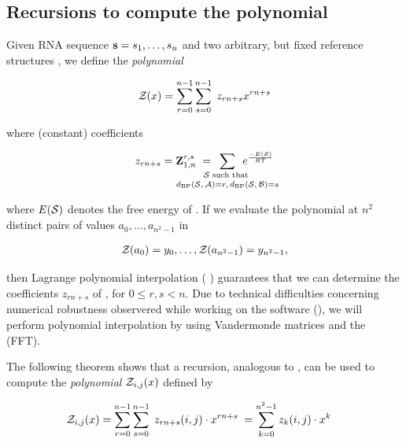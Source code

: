 \documentclass[11pt, oneside]{Thesis} %
\providecommand{\DIFadd}[1]{{\protect\color{blue}\uwave{#1}}} %
\providecommand{\DIFaddbegin}{} %
\providecommand{\DIFaddend}{} %
\providecommand{\DIFdelbegin}{} %
\providecommand{\DIFdelend}{} %
\begin{document}
\subsection{Recursions to compute the polynomial
\texorpdfstring{}{}}
\label{subsec:ffttwo:polynomial}

Given RNA sequence ${\bf s} = s_1,\dots,s_n$
and two arbitrary, but fixed reference
structures \strAB, we define the {\em polynomial}

\begin{align}
\label{eq:ffttwo:zOfX}
\fullZx = \sum_{r=0}^{n-1} \sum_{s=0}^{n-1}\; z_{rn+s} x^{rn+s}
\end{align}

where (constant) coefficients

\begin{align}
z_{rn+s} = \bfZ{r,s}{1,n}\;=
\enspace\sum_{\mathclap{\substack{
\str \text{ such that } \rule[-.5ex]{0pt}{0pt} \\
\dBP{\str}{\strA} = r,\,\dBP{\str}{\strB} = s
}}}\enspace
\boltzF{\str}
\end{align}

where $E(\mathcal S)$ denotes the free energy of \str.
If we evaluate the polynomial \fullZx at $n^2$ distinct pairs of values
$a_0,\dots,a_{n^2-1}$ in

\begin{align}
\label{eq:ffttwo:solutionsForAlpha}
\emZof{}{a_0} = y_{0}, \dots, \emZof{}{a_{n^2-1}} = y_{n^2-1},
\end{align}

then Lagrange polynomial interpolation
(\DIFdelbegin %
\DIFdelend \DIFaddbegin \DIFadd{equation \ref{eq:fftbor:lagrangeInterpolation}}\DIFaddend )
guarantees that we can determine the coefficients $z_{rn+s}$ of \fullZx,
for $0 \leq r,s < n$. Due to technical difficulties concerning numerical
robustness observered while working on the \fftbor software
(), we will perform polynomial interpolation
by using Vandermonde matrices and the \fft (FFT).

The following theorem shows that a
recursion, analogous to ,
can be used to compute
the {\em polynomial} ${\mathcal Z}_{i,j}(x)$ defined by

\begin{align}
\label{eq:ffttwo:emZij}
\emZ{i,j} &= \sum_{r=0}^{n-1} \sum_{s=0}^{n-1}\;
z_{rn+s}(i,j) \cdot x^{rn+s}\; =
\sum_{k=0}^{n^2-1} z_{k}(i,j) \cdot x^{k}
\end{align}
\end{document}
